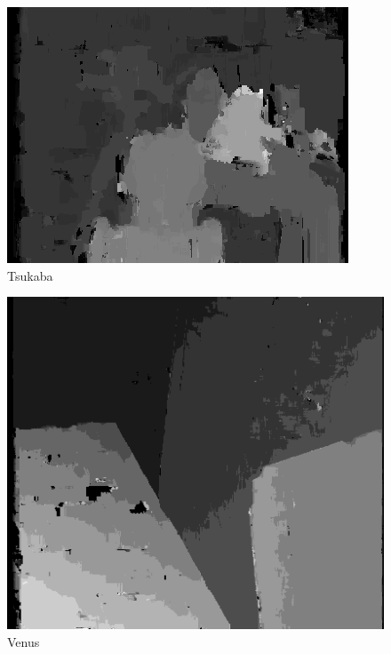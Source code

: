 \documentclass[12pt,a4paper,oneside,final]{article}
\begin{document}
\begin{subfigure}[b]{0.32\textwidth}
	\includegraphics[width=\textwidth]{disparity_s4_k11set_1.png}
	\caption{Tsukaba}
\end{subfigure}
\begin{subfigure}[b]{0.32\textwidth}
	\includegraphics[width=\textwidth]{disparity_s4_k11set_2.png}
	\caption{Venus}
\end{subfigure}
\end{document}
